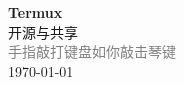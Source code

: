 \vspace*{\fill}
\begin{center}
    \textcolor{orange!50}{\Huge\textbf{Termux}} \\[1em]
    \textcolor{orange!60!pink}{\Large 开源与共享} \\[2em]
    \textcolor{gray}{\large 手指敲打键盘如你敲击琴键} \\[1em]
    \today
\end{center}
\vspace*{\fill}
\clearpage


\clearpage

\clearpage


